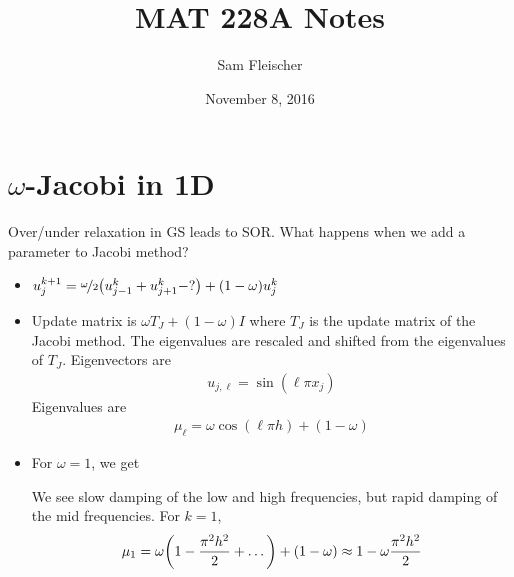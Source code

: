 \documentclass{article}
\title{MAT 228A Notes}
\author{Sam Fleischer}
\date{November 8, 2016}
\begin{document}
    \maketitle

    \section{$\omega$-Jacobi in 1D}
        Over/under relaxation in GS leads to SOR.  What happens when we add a parameter to Jacobi method?
        \begin{itemize}
            \item
                $u_j^{k+1} = \nicefrac{\omega}{2}\qty(u_{j-1}^k + u_{j+1}^k - ?) + \qty(1 - \omega)u_j^k$
            \item
                Update matrix is $\omega T_J + (1 - \omega)I$ where $T_J$ is the update matrix of the Jacobi method.  The eigenvalues are rescaled and shifted from the eigenvalues of $T_J$.  Eigenvectors are
                \begin{align*}
                    u_{j,\ell} = \sin(\ell\pi x_j)
                \end{align*}
                Eigenvalues are
                \begin{align*}
                    \mu_\ell = \omega\cos(\ell\pi h) + (1 - \omega)
                \end{align*}
            \item
                For $\omega = 1$, we get
                \begin{figure}[ht!]
                    \centering
                \end{figure}
                \FloatBarrier
                We see slow damping of the low and high frequencies, but rapid damping of the mid frequencies.  For $k = 1$,
                \begin{align*}
                    \mu_1 = \omega\qty(1 - \frac{\pi^2 h^2}{2} + \dots) + \qty(1 - \omega) \approx 1 - \omega\frac{\pi^2h^2}{2}

\end{align*}
\end{itemize}
\end{document}
